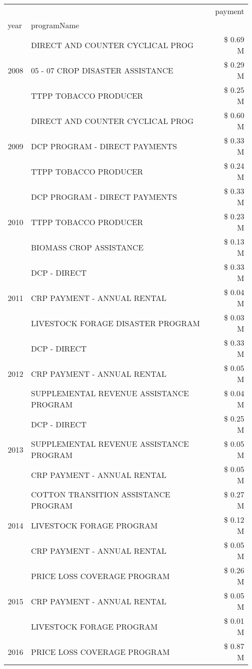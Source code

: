 \begin{tabular}{llr}
\toprule
 &  & payment \\
year & programName &  \\
\midrule
\multirow[t]{3}{*}{2008} & DIRECT AND COUNTER CYCLICAL PROG & \$ 0.69 M \\
 & 05 - 07 CROP DISASTER ASSISTANCE & \$ 0.29 M \\
 & TTPP TOBACCO PRODUCER & \$ 0.25 M \\
\cline{1-3}
\multirow[t]{3}{*}{2009} & DIRECT AND COUNTER CYCLICAL PROG & \$ 0.60 M \\
 & DCP PROGRAM - DIRECT PAYMENTS & \$ 0.33 M \\
 & TTPP TOBACCO PRODUCER & \$ 0.24 M \\
\cline{1-3}
\multirow[t]{3}{*}{2010} & DCP PROGRAM - DIRECT PAYMENTS & \$ 0.33 M \\
 & TTPP TOBACCO PRODUCER & \$ 0.23 M \\
 & BIOMASS CROP ASSISTANCE & \$ 0.13 M \\
\cline{1-3}
\multirow[t]{3}{*}{2011} & DCP - DIRECT & \$ 0.33 M \\
 & CRP PAYMENT - ANNUAL RENTAL & \$ 0.04 M \\
 & LIVESTOCK FORAGE DISASTER PROGRAM & \$ 0.03 M \\
\cline{1-3}
\multirow[t]{3}{*}{2012} & DCP - DIRECT & \$ 0.33 M \\
 & CRP PAYMENT - ANNUAL RENTAL & \$ 0.05 M \\
 & SUPPLEMENTAL REVENUE ASSISTANCE PROGRAM & \$ 0.04 M \\
\cline{1-3}
\multirow[t]{3}{*}{2013} & DCP - DIRECT & \$ 0.25 M \\
 & SUPPLEMENTAL REVENUE ASSISTANCE PROGRAM & \$ 0.05 M \\
 & CRP PAYMENT - ANNUAL RENTAL & \$ 0.05 M \\
\cline{1-3}
\multirow[t]{3}{*}{2014} & COTTON TRANSITION ASSISTANCE PROGRAM & \$ 0.27 M \\
 & LIVESTOCK FORAGE PROGRAM & \$ 0.12 M \\
 & CRP PAYMENT - ANNUAL RENTAL & \$ 0.05 M \\
\cline{1-3}
\multirow[t]{3}{*}{2015} & PRICE LOSS COVERAGE PROGRAM & \$ 0.26 M \\
 & CRP PAYMENT - ANNUAL RENTAL & \$ 0.05 M \\
 & LIVESTOCK FORAGE PROGRAM & \$ 0.01 M \\
\cline{1-3}
\multirow[t]{3}{*}{2016} & PRICE LOSS COVERAGE PROGRAM                   & \$ 0.87 M \\

\end{tabular}
